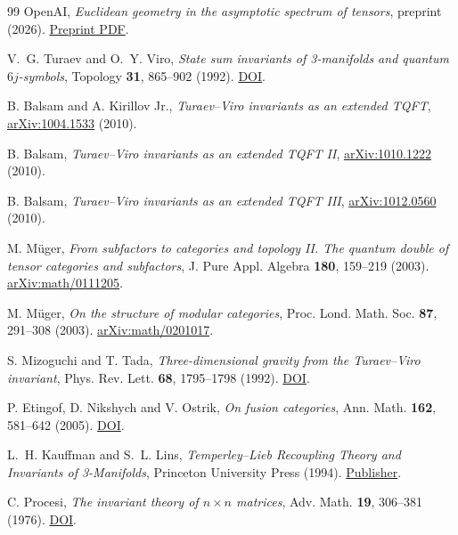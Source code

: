 \documentclass[11pt]{article}
\numberwithin{equation}{section}
\theoremstyle{definition}
\theoremstyle{remark}
\begin{document}
\begin{thebibliography}{99}
OpenAI, \emph{Euclidean geometry in the asymptotic spectrum of tensors}, preprint (2026).
\href{https://mathcommunity.github.io/oai-math-revised/papers/Euclidean-geometry-in-the-asymptotic-spectrum-of-tensors-November-24-2026/paper.pdf}{Preprint PDF}.

V.~G. Turaev and O.~Y. Viro, \emph{State sum invariants of 3-manifolds and quantum \(6j\)-symbols}, Topology \textbf{31}, 865--902 (1992).
\href{https://doi.org/10.1016/0040-9383(92)90015-A}{DOI}.

B. Balsam and A. Kirillov Jr., \emph{Turaev--Viro invariants as an extended TQFT}, \href{https://arxiv.org/abs/1004.1533}{arXiv:1004.1533} (2010).

B. Balsam, \emph{Turaev--Viro invariants as an extended TQFT II}, \href{https://arxiv.org/abs/1010.1222}{arXiv:1010.1222} (2010).

B. Balsam, \emph{Turaev--Viro invariants as an extended TQFT III}, \href{https://arxiv.org/abs/1012.0560}{arXiv:1012.0560} (2010).

M. M\"uger, \emph{From subfactors to categories and topology II. The quantum double of tensor categories and subfactors}, J. Pure Appl. Algebra \textbf{180}, 159--219 (2003).
\href{https://arxiv.org/abs/math/0111205}{arXiv:math/0111205}.

M. M\"uger, \emph{On the structure of modular categories}, Proc. Lond. Math. Soc. \textbf{87}, 291--308 (2003).
\href{https://arxiv.org/abs/math/0201017}{arXiv:math/0201017}.

S. Mizoguchi and T. Tada, \emph{Three-dimensional gravity from the Turaev--Viro invariant}, Phys. Rev. Lett. \textbf{68}, 1795--1798 (1992).
\href{https://doi.org/10.1103/PhysRevLett.68.1795}{DOI}.

P. Etingof, D. Nikshych and V. Ostrik, \emph{On fusion categories}, Ann. Math. \textbf{162}, 581--642 (2005).
\href{https://doi.org/10.4007/annals.2005.162.581}{DOI}.

L.~H. Kauffman and S.~L. Lins, \emph{Temperley--Lieb Recoupling Theory and Invariants of 3-Manifolds}, Princeton University Press (1994).
\href{https://press.princeton.edu/books/paperback/9780691036403/temperley-lieb-recoupling-theory-and-invariants-of-3-manifolds}{Publisher}.

C. Procesi, \emph{The invariant theory of \(n\times n\) matrices}, Adv. Math. \textbf{19}, 306--381 (1976).
\href{https://doi.org/10.1016/0001-8708(76)90027-X}{DOI}.


\end{thebibliography}
\end{document}
